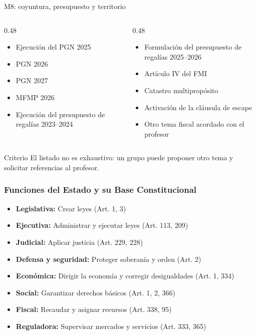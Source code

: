 \begin{frame}{M8: coyuntura, presupuesto y territorio}
\small
\begin{columns}[T,onlytextwidth]
  \begin{column}{0.48\textwidth}
    \begin{itemize}
      \item Ejecuci\'on del PGN 2025
      \item PGN 2026
      \item PGN 2027
      \item MFMP 2026
      \item Ejecuci\'on del presupuesto de regal\'ias 2023--2024
    \end{itemize}
  \end{column}
  \begin{column}{0.48\textwidth}
    \begin{itemize}
      \item Formulaci\'on del presupuesto de regal\'ias 2025--2026
      \item Art\'iculo IV del FMI
      \item Catastro multiprop\'osito
      \item Activaci\'on de la cl\'ausula de escape
      \item Otro tema fiscal acordado con el profesor
    \end{itemize}
  \end{column}
\end{columns}
\begin{alertblock}{Criterio}
El listado no es exhaustivo: un grupo puede proponer otro tema y solicitar referencias al profesor.
\end{alertblock}
\end{frame}

\begin{frame}
  \frametitle{Funciones del Estado y su Base Constitucional}
  \begin{itemize}
    \item \textbf{Legislativa:} Crear leyes (Art. 1, 3)
    \item \textbf{Ejecutiva:} Administrar y ejecutar leyes (Art. 113, 209)
    \item \textbf{Judicial:} Aplicar justicia (Art. 229, 228)
    \item \textbf{Defensa y seguridad:} Proteger soberan\'ia y orden (Art. 2)
    \item \textbf{Econ\'omica:} Dirigir la econom\'ia y corregir desigualdades (Art. 1, 334)
    \item \textbf{Social:} Garantizar derechos b\'asicos (Art. 1, 2, 366)
    \item \textbf{Fiscal:} Recaudar y asignar recursos (Art. 338, 95)
    \item \textbf{Reguladora:} Supervisar mercados y servicios (Art. 333, 365)
  \end{itemize}
\end{frame}


